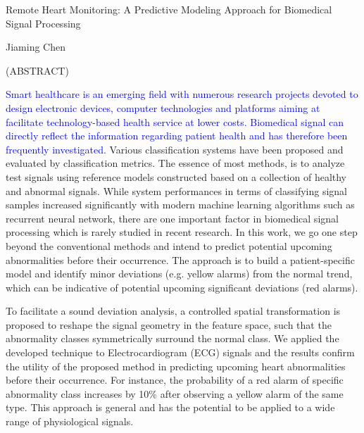 
\begin{center}

\vfill

{\large Remote Heart Monitoring: A Predictive Modeling Approach for Biomedical Signal Processing }


Jiaming Chen

{(ABSTRACT)}




\vfill

\end{center}

\textcolor{blue}{Smart healthcare is an emerging field with numerous research projects devoted to design electronic devices, computer technologies and platforms aiming at facilitate technology-based health service at lower costs. Biomedical signal can directly reflect the information regarding patient health and has therefore been frequently investigated.} %
 Various classification systems have been proposed and evaluated by classification metrics. The essence of most methods, is to analyze test signals using reference models constructed based on a collection of healthy and abnormal signals. While system performances in terms of classifying signal samples increased significantly with modern machine learning algorithms such as recurrent neural network, there are one important factor in biomedical signal processing which is rarely studied in recent research.  In this work, we go one step beyond the conventional methods and intend to predict potential upcoming abnormalities before their occurrence. The approach is to build a patient-specific model and identify minor deviations (e.g. yellow alarms) from the normal trend, which can be indicative of potential upcoming significant deviations (red alarms). 

To facilitate a sound deviation analysis, a controlled spatial transformation is proposed to reshape the signal geometry in the feature space, such that the abnormality classes symmetrically surround the normal class. We applied the developed technique to Electrocardiogram (ECG) signals and the results confirm the utility of the proposed method in predicting upcoming heart abnormalities before their occurrence. For instance, the probability of a red alarm of specific abnormality class increases by 10\% after observing a yellow alarm of the same type. This approach is general and has the potential to be applied to a wide range of physiological signals.


